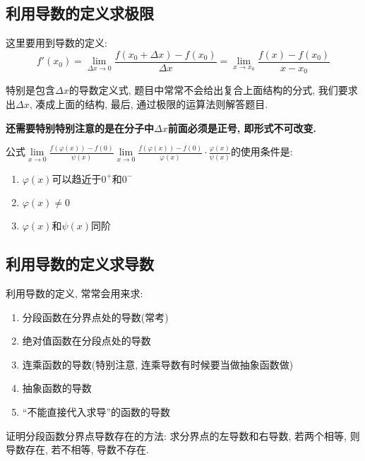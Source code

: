 \subsection{利用导数的定义求极限}
这里要用到导数的定义:
\begin{equation*}
f'(x_{0})=\lim\limits_{\Delta x \rightarrow 0} \frac{f(x_{0}+\Delta x)-f(x_{0})}{\Delta x}=\lim\limits_{x \rightarrow x_{0}} \frac{f(x)-f(x_{0})}{x-x_{0}}
\end{equation*}\par
特别是包含$ \Delta x $的导数定义式, 题目中常常不会给出复合上面结构的分式, 我们要求出$ \Delta x $, 凑成上面的结构, 最后, 通过极限的运算法则解答题目.\par
\textbf{还需要特别特别注意的是在分子中$ \Delta x $前面必须是正号, 即形式不可改变.}
\begin{tcolorbox}
公式$ \lim\limits_{x \rightarrow 0}\frac{f(\varphi(x))-f(0)}{\psi(x)}\lim\limits_{x \rightarrow 0}\frac{f(\varphi(x))-f(0)}{\varphi(x)}\cdot\frac{\varphi(x)}{\psi(x)} $的使用条件是:
\begin{enumerate}
\item $ \varphi(x) $可以趋近于$ 0^{+} $和$ 0^{-} $
\item $ \varphi(x)\neq 0 $
\item $ \varphi(x) $和$ \psi(x) $同阶
\end{enumerate}
\end{tcolorbox}
\subsection{利用导数的定义求导数}
利用导数的定义, 常常会用来求:
\begin{enumerate}
\item 分段函数在分界点处的导数(常考)
\item 绝对值函数在分段点处的导数
\item 连乘函数的导数(特别注意, 连乘导数有时候要当做抽象函数做)
\item 抽象函数的导数
\item ``不能直接代入求导''的函数的导数
\end{enumerate}\par
证明分段函数分界点导数存在的方法: 求分界点的左导数和右导数, 若两个相等, 则导数存在, 若不相等, 导数不存在.
